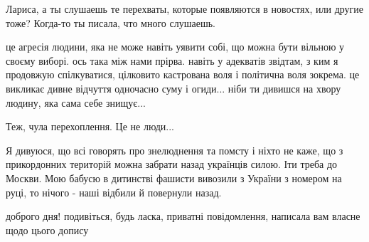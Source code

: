 \begin{itemize}
Лариса, а ты слушаешь те перехваты, которые появляются в новостях, или другие
тоже? Когда-то ты писала, что много слушаешь.


це агресія людини, яка не може навіть уявити собі, що можна бути вільною у
своєму виборі. ось така між нами прірва. навіть у адекватів звідтам, з ким я
продовжую спілкуватися, цілковито кастрована воля і політична воля зокрема. це
викликає дивне відчуття одночасно суму і огиди... ніби ти дивишся на хвору
людину, яка сама себе знищує...

Теж, чула перехоплення. Це не люди...


Я дивуюся, що всі говорять про знелюднення та помсту і ніхто не каже, що з
прикордонних територій можна забрати назад українців силою. Іти треба до
Москви. Мою бабусю в дитинстві фашисти вивозили з України з номером на руці, то
нічого - наші відбили й повернули назад.


доброго дня! подивіться, будь ласка, приватні повідомлення, написала вам власне
щодо цього допису

\end{itemize} %
